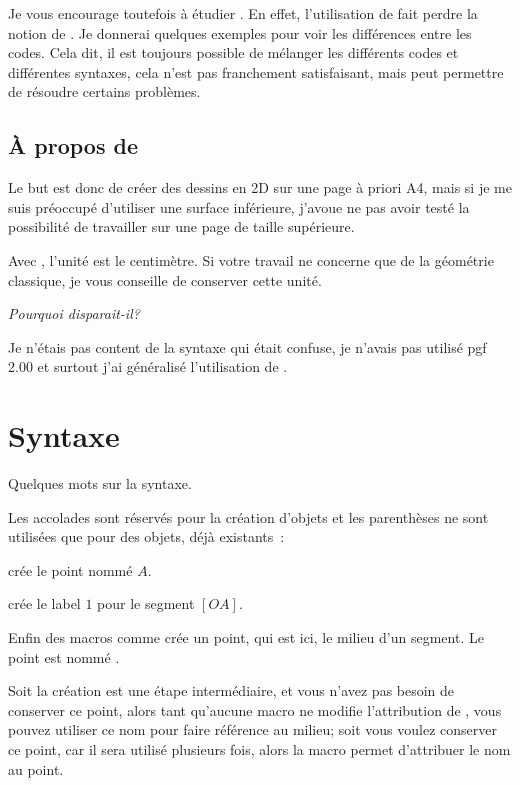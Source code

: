 Je vous encourage toutefois à étudier \TIKZ. En effet, l'utilisation de  fait perdre la notion de . Je donnerai quelques exemples pour voir les différences entre les codes. Cela dit, il est toujours possible de mélanger les différents codes et différentes syntaxes, cela n'est pas franchement satisfaisant, mais peut permettre de résoudre certains problèmes.


\subsection{À propos de }

Le but est donc de créer des dessins en 2D sur une page à priori A4, mais si je me suis préoccupé d'utiliser une surface inférieure, j'avoue ne pas avoir testé la possibilité de travailler sur une page de taille supérieure.

Avec , l'unité est le centimètre. Si votre travail ne concerne que de la géométrie classique, je vous conseille de conserver cette unité.

\emph{Pourquoi  disparait-il?}

Je n'étais pas content de la syntaxe qui était confuse, je n'avais pas utilisé pgf 2.00 et surtout j'ai généralisé l'utilisation de .

\clearpage \newpage
\section{Syntaxe}
Quelques mots sur la syntaxe.

 Les accolades sont réservés pour la création d'objets et les parenthèses ne sont utilisées que pour des objets, déjà existants~:
 
  crée le point nommé $A$.
 
 crée le label $1$ pour le segment $[OA]$.
 
 Enfin des macros comme  crée un point, qui est ici, le milieu d'un segment. Le point est nommé . 

Soit la création est une étape intermédiaire, et vous n'avez pas besoin de conserver ce point, alors tant qu'aucune macro ne modifie  l'attribution de , vous pouvez utiliser ce nom pour faire référence au milieu; soit   vous voulez conserver ce point, car il sera utilisé plusieurs fois, alors la macro   permet d'attribuer le nom  au point.

